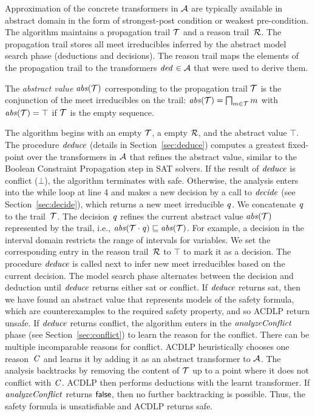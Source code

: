 {Approximation of the concrete transformers in 
$\mathcal{A}$ are typically available in abstract domain in the 
form of strongest-post condition or weakest pre-condition. 
The algorithm maintains a propagation trail $\mathcal{T}$ and 
a reason trail~$\mathcal{R}$.
The propagation trail stores all meet irreducibles inferred by 
the abstract model search phase (deductions and decisions).  
The reason trail maps the elements of the propagation trail to the
transformers $\mathit{ded}^{}\in\mathcal{A}$ that were used to
derive them. 
%
\begin{definition} 
The \emph{abstract value} $\mathit{abs}(\mathcal{T})$ corresponding to 
the propagation trail $\mathcal{T}$ is the conjunction of the 
meet irreducibles on the trail:
$\mathit{abs}(\mathcal{T})=\bigsqcap_{m \in \mathcal{T}}m$ with
$\mathit{abs}(\mathcal{T})=\top$ if $\mathcal{T}$ is the empty sequence.
\end{definition}
%
The algorithm begins with an empty $\mathcal{T}$, a empty $\mathcal{R}$, and the
abstract value $\top$.  The procedure $\mathit{deduce}$ (details in
Section~\ref{sec:deduce}) computes a greatest fixed-point over the
transformers in $\mathcal{A}$ that refines the abstract value,
similar to the Boolean Constraint Propagation
step in SAT solvers.  If the result of $\mathit{deduce}$
is \textsf{conflict} ($\bot$), the algorithm terminates with
\textsf{safe}.  Otherwise, the analysis enters into the while loop at line 4
and makes a new decision by a call to $\mathit{decide}$ (see
Section~\ref{sec:decide}), which returns a new meet irreducible
$\mathit{q}$.
%
We concatenate $\mathit{q}$ to the trail~$\mathcal{T}$.  The decision
$\mathit{q}$ refines the current abstract value $\mathit{abs}(\mathcal{T})$ represented
by the trail, i.e., $\mathit{abs}(\mathcal{T}\cdot\mathit{q})\sqsubseteq \mathit{abs}(\mathcal{T})$.
%
For example, a decision in the interval domain restricts the range of 
intervals for variables.
%
We set the corresponding entry in the reason trail~$\mathcal{R}$ to $\top$
to mark it as a decision.
%
The procedure $\mathit{deduce}$ is called next to infer new meet irreducibles
based on the current decision.  The model search phase
alternates between the decision and deduction until $\mathit{deduce}$ returns
either \textsf{sat} or \textsf{conflict}.  
%
If  $\mathit{deduce}$ returns  \textsf{sat}, then 
we have found an abstract value that represents models of the safety formula, which
are counterexamples to the required safety property, and so ACDLP return
\textsf{unsafe}.
%
If  $\mathit{deduce}$ returns  \textsf{conflict}, 
the algorithm enters in the $\mathit{analyzeConflict}$ 
phase (see Section~\ref{sec:conflict}) to learn the reason for the conflict.   There can be multiple
incomparable reasons for conflict.  ACDLP heuristically 
chooses one reason~$\mathit{C}$ and learns it 
by adding it as an abstract transformer to $\mathcal{A}$. The analysis 
backtracks by removing the content of $\mathcal{T}$ up to a point where it does not 
conflict with $\mathit{C}$.  ACDLP then performs deductions with the learnt 
transformer.  If $\mathit{analyzeConflict}$ returns $\mathsf{false}$, then no further
backtracking is possible.  Thus, the safety formula is unsatisfiable
and ACDLP returns \textsf{safe}.
}
